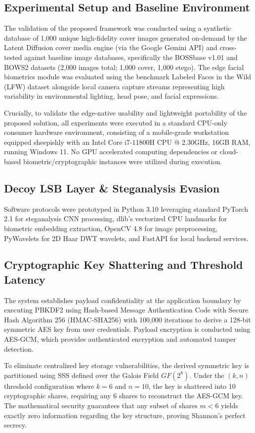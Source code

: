 \documentclass[conference]{IEEEtran}
\begin{document}
\subsection{Experimental Setup and Baseline Environment}
The validation of the proposed framework was conducted using a synthetic database of 1,000 unique high-fidelity cover images generated on-demand by the Latent Diffusion cover media engine (via the Google Gemini API) and cross-tested against baseline image databases, specifically the BOSSbase v1.01 and BOWS2 datasets (2,000 images total; 1,000 cover, 1,000 stego). The edge facial biometrics module was evaluated using the benchmark Labeled Faces in the Wild (LFW) dataset alongside local camera capture streams representing high variability in environmental lighting, head pose, and facial expressions.

Crucially, to validate the edge-native usability and lightweight portability of the proposed solution, all experiments were executed in a standard CPU-only consumer hardware environment, consisting of a mobile-grade workstation equipped sheepishly with an Intel Core i7-11800H CPU @ 2.30GHz, 16GB RAM, running Windows 11. No GPU accelerated computing dependencies or cloud-based biometric/cryptographic instances were utilized during execution.

\subsection{Decoy LSB Layer \& Steganalysis Evasion}
Software protocols were prototyped in Python 3.10 leveraging standard PyTorch 2.1 for steganalysis CNN processing, dlib's vectorized CPU landmarks for biometric embedding extraction, OpenCV 4.8 for image preprocessing, PyWavelets for 2D Haar DWT wavelets, and FastAPI for local backend services.

\subsection{Cryptographic Key Shattering and Threshold Latency}
The system establishes payload confidentiality at the application boundary by executing PBKDF2 using Hash-based Message Authentication Code with Secure Hash Algorithm 256 (HMAC-SHA256) with 100,000 iterations to derive a 128-bit symmetric AES key from user credentials. Payload encryption is conducted using AES-GCM, which provides authenticated encryption and automated tamper detection.

To eliminate centralized key storage vulnerabilities, the derived symmetric key is partitioned using SSS defined over the Galois Field $GF(2^8)$. Under the $(k,n)$ threshold configuration where $k = 6$ and $n = 10$, the key is shattered into 10 cryptographic shares, requiring any 6 shares to reconstruct the AES-GCM key. The mathematical security guarantees that any subset of shares $m < 6$ yields exactly zero information regarding the key structure, proving Shannon's perfect secrecy.
\end{document}
